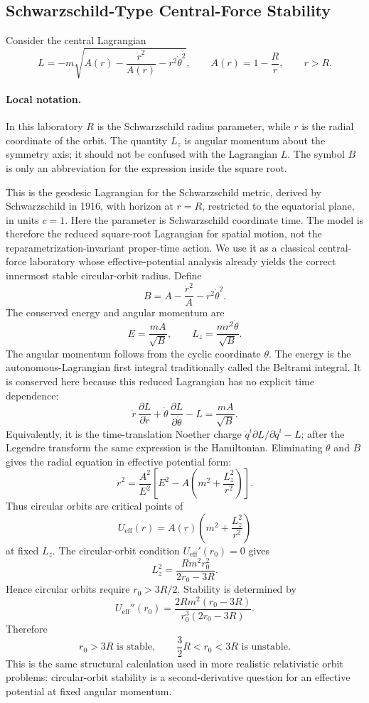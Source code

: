 \subsection{Schwarzschild-Type Central-Force Stability}
\label{sec:lab-schwarzschild-stability}

Consider the central Lagrangian
\[
  L=-m\sqrt{
    A(r)-\frac{\dot r^2}{A(r)}-r^2\dot\theta^2
  },
  \qquad
  A(r)=1-\frac{R}{r},
  \qquad r>R.
\]

\paragraph{Local notation.}
In this laboratory \(R\) is the Schwarzschild radius parameter, while \(r\) is
the radial coordinate of the orbit.  The quantity \(L_z\) is angular momentum
about the symmetry axis; it should not be confused with the Lagrangian \(L\).
The symbol \(B\) is only an abbreviation for the expression inside the square
root.

This is the geodesic Lagrangian for the Schwarzschild metric, derived by
Schwarzschild in 1916, with horizon at \(r=R\), restricted to the equatorial
plane, in units \(c=1\). Here the parameter is Schwarzschild coordinate time.
The model is therefore the reduced square-root Lagrangian for spatial motion,
not the reparametrization-invariant proper-time action. We use it as a
classical central-force laboratory whose effective-potential analysis already
yields the correct innermost stable circular-orbit radius.
Define
\[
  B=A-\frac{\dot r^2}{A}-r^2\dot\theta^2.
\]
The conserved energy and angular momentum are
\[
  E=\frac{mA}{\sqrt B},
  \qquad
  L_z=\frac{mr^2\dot\theta}{\sqrt B}.
\]
The angular momentum follows from the cyclic coordinate \(\theta\). The energy
is the autonomous-Lagrangian first integral traditionally called the Beltrami
integral. It is conserved here because this reduced Lagrangian has no explicit
time dependence:
\[
  \dot r\,\frac{\partial L}{\partial\dot r}
  +
  \dot\theta\,\frac{\partial L}{\partial\dot\theta}
  -
  L
  =
  \frac{mA}{\sqrt B}.
\]
Equivalently, it is the time-translation Noether charge
\(\dot q^i\partial L/\partial\dot q^i-L\); after the Legendre transform the
same expression is the Hamiltonian.
Eliminating \(\dot\theta\) and \(B\) gives the radial equation in effective
potential form:
\[
  \dot r^2
  =
  \frac{A^2}{E^2}
  \left[
    E^2-A\left(m^2+\frac{L_z^2}{r^2}\right)
  \right].
\]
Thus circular orbits are critical points of
\[
  U_{\mathrm{eff}}(r)
  =
  A(r)\left(m^2+\frac{L_z^2}{r^2}\right)
\]
at fixed \(L_z\). The circular-orbit condition \(U_{\mathrm{eff}}'(r_0)=0\)
gives
\[
  L_z^2
  =
  \frac{Rm^2r_0^2}{2r_0-3R}.
\]
Hence circular orbits require \(r_0>3R/2\). Stability is determined by
\[
  U_{\mathrm{eff}}''(r_0)
  =
  \frac{2Rm^2(r_0-3R)}
  {r_0^3(2r_0-3R)}.
\]
Therefore
\[
  \boxed{
  r_0>3R \text{ is stable},\qquad
  \frac32R<r_0<3R \text{ is unstable}.
  }
\]
This is the same structural calculation used in more realistic relativistic
orbit problems: circular-orbit stability is a second-derivative question for
an effective potential at fixed angular momentum.

